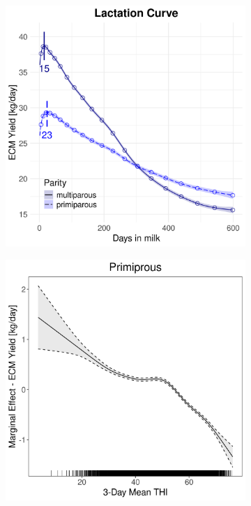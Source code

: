 \begin{figure}[H]
\begin{subfigure}[b]{0.45\textwidth}
        \includegraphics[width=\textwidth]{thesis/figures/models/ecm/after2010/ho_ecm_after2010/ho_ecm_after2010_marginal_dim_milk_combined.png}
    \end{subfigure}
    \begin{subfigure}[b]{0.45\textwidth}
        \centering
        \includegraphics[width=\textwidth]{thesis/figures/models/ecm/after2010/ho_ecm_after2010/ho_ecm_after2010_marginal_thi_milk_primi.png}

\end{subfigure}
\end{figure}
